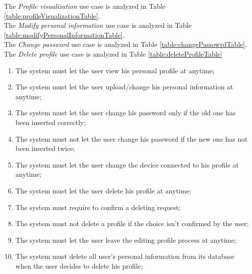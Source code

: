 The \textit{Profile visualization} use case is analyzed in Table \ref{table:profileVisualizationTable}. \\
The \textit{Modify personal information} use case is analyzed in Table \ref{table:modifyPersonalInformationTable}. \\
The \textit{Change password} use case is analyzed in Table \ref{table:changePassowrdTable}. \\
The \textit{Delete profile} use case is analyzed in Table \ref{table:deleteProfileTable} \\

\begin{enumerate}
  \item The system must let the user view his personal profile at anytime;
  \item The system must let the user upload/change his personal information at anytime;
  \item The system must let the user change his password only if the old one has been inserted correctly;
  \item The system must not let the user change his password if the new one has not been inserted twice;
  \item The system must let the user change the device connected to his profile at anytime;
  \item The system must let the user delete his profile at anytime;
  \item The system must require to confirm a deleting request;
  \item The system must not delete a profile if the choice isn't confirmed by the user;
  \item The system must let the user leave the editing profile process at anytime;
  \item The system must delete all user's personal information from its database when the user decides to delete his profile;
\end{enumerate}

